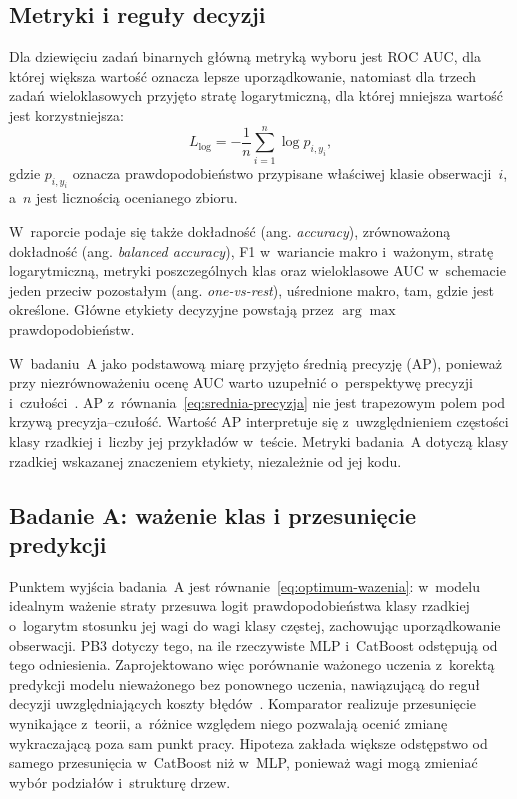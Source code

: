 \subsection{Metryki i reguły decyzji}
\label{sec:metryki}

Dla dziewięciu zadań binarnych główną metryką wyboru jest ROC AUC, dla której większa wartość oznacza lepsze uporządkowanie, natomiast dla trzech zadań wieloklasowych przyjęto stratę logarytmiczną, dla której mniejsza wartość jest korzystniejsza:
\begin{equation}
L_{\log}=-\frac{1}{n}\sum_{i=1}^{n}\log p_{i,y_i},
\label{eq:logloss-badanie}
\end{equation}
gdzie $p_{i,y_i}$ oznacza prawdopodobieństwo przypisane właściwej klasie obserwacji~$i$, a~$n$ jest licznością ocenianego zbioru.

W~raporcie podaje się także dokładność (ang. \textit{accuracy}), zrównoważoną dokładność (ang. \textit{balanced accuracy}), F1 w~wariancie makro i~ważonym, stratę logarytmiczną, metryki poszczególnych klas oraz wieloklasowe AUC w~schemacie jeden przeciw pozostałym (ang. \textit{one-vs-rest}), uśrednione makro, tam, gdzie jest określone. Główne etykiety decyzyjne powstają przez $\arg\max$ prawdopodobieństw.

W~badaniu~A jako podstawową miarę przyjęto średnią precyzję (AP), ponieważ przy niezrównoważeniu ocenę AUC warto uzupełnić o~perspektywę precyzji i~czułości~\cite{saito2015pr}. AP z~równania~\eqref{eq:srednia-precyzja} nie jest trapezowym polem pod krzywą precyzja--czułość. Wartość AP interpretuje się z~uwzględnieniem częstości klasy rzadkiej i~liczby jej przykładów w~teście. Metryki badania~A dotyczą klasy rzadkiej wskazanej znaczeniem etykiety, niezależnie od jej kodu.

\subsection{Badanie A: ważenie klas i przesunięcie predykcji}
\label{sec:projekt-wazenie}

Punktem wyjścia badania~A jest równanie~\eqref{eq:optimum-wazenia}: w~modelu idealnym ważenie straty przesuwa logit prawdopodobieństwa klasy rzadkiej o~logarytm stosunku jej wagi do wagi klasy częstej, zachowując uporządkowanie obserwacji. PB3 dotyczy tego, na ile rzeczywiste MLP i~CatBoost odstępują od tego odniesienia. Zaprojektowano więc porównanie ważonego uczenia z~korektą predykcji modelu nieważonego bez ponownego uczenia, nawiązującą do reguł decyzji uwzględniających koszty błędów~\cite{elkan2001cost}. Komparator realizuje przesunięcie wynikające z~teorii, a~różnice względem niego pozwalają ocenić zmianę wykraczającą poza sam punkt pracy. Hipoteza zakłada większe odstępstwo od samego przesunięcia w~CatBoost niż w~MLP, ponieważ wagi mogą zmieniać wybór podziałów i~strukturę drzew.

